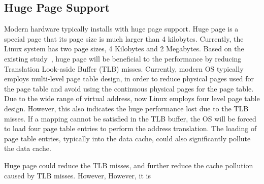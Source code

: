 \subsection{Huge Page Support}

Modern hardware typically installs with huge page support. Huge page is a special page that its page size is much larger than 4 kilobytes. Currently, the Linux system has two page sizes, 4 Kilobytes and 2 Megabytes.  
Based on the existing study~\cite{hugepages}, huge page will be beneficial to the performance by reducing Translation Look-aside Buffer (TLB) misses.  Currently, modern OS typically employs multi-level page table design, in order to reduce physical pages used for the page table and avoid using the continuous physical pages for the page table. Due to the wide range of virtual address, now Linux employs four level page table design. However, this also indicates the huge performance lost due to the TLB misses. If a mapping cannot be satisfied in the TLB buffer, the OS will be forced to load four page table entries to perform the address translation. The loading of page table entries, typically into the data cache, could also significantly pollute the data cache. 
 
Huge page could reduce the TLB misses, and further reduce the cache pollution caused by TLB misses. However, 
However, it is 



